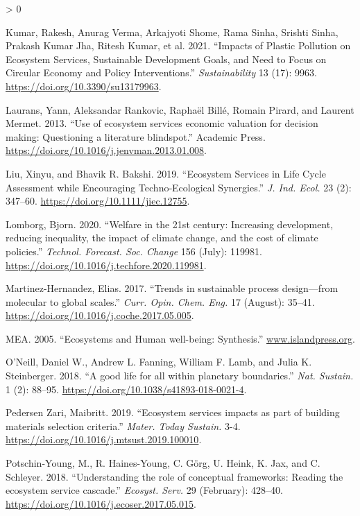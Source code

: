 \documentclass[
]{article}
\newlength{\cslhangindent}
\newenvironment{CSLReferences}[2] %
 {%
  \setlength{\parindent}{0pt}
  \ifodd #1 \everypar{\setlength{\hangindent}{\cslhangindent}}\ignorespaces\fi
  \ifnum #2 > 0
  \setlength{\parskip}{#2\baselineskip}
  \fi
 }%
 {}
\begin{document}
\begin{CSLReferences}{1}{0}
\leavevmode\hypertarget{ref-Kumar2021}{}%
Kumar, Rakesh, Anurag Verma, Arkajyoti Shome, Rama Sinha, Srishti Sinha, Prakash Kumar Jha, Ritesh Kumar, et al. 2021. {``{Impacts of Plastic Pollution on Ecosystem Services, Sustainable Development Goals, and Need to Focus on Circular Economy and Policy Interventions}.''} \emph{Sustainability} 13 (17): 9963. \url{https://doi.org/10.3390/su13179963}.

\leavevmode\hypertarget{ref-Laurans2013}{}%
Laurans, Yann, Aleksandar Rankovic, Raphaël Billé, Romain Pirard, and Laurent Mermet. 2013. {``{Use of ecosystem services economic valuation for decision making: Questioning a literature blindspot}.''} Academic Press. \url{https://doi.org/10.1016/j.jenvman.2013.01.008}.

\leavevmode\hypertarget{ref-Liu2019g}{}%
Liu, Xinyu, and Bhavik R. Bakshi. 2019. {``{Ecosystem Services in Life Cycle Assessment while Encouraging Techno‐Ecological Synergies}.''} \emph{J. Ind. Ecol.} 23 (2): 347--60. \url{https://doi.org/10.1111/jiec.12755}.

\leavevmode\hypertarget{ref-Lomborg2020}{}%
Lomborg, Bjorn. 2020. {``{Welfare in the 21st century: Increasing development, reducing inequality, the impact of climate change, and the cost of climate policies}.''} \emph{Technol. Forecast. Soc. Change} 156 (July): 119981. \url{https://doi.org/10.1016/j.techfore.2020.119981}.

\leavevmode\hypertarget{ref-Martinez-Hernandez2017}{}%
Martinez-Hernandez, Elias. 2017. {``{Trends in sustainable process design---from molecular to global scales}.''} \emph{Curr. Opin. Chem. Eng.} 17 (August): 35--41. \url{https://doi.org/10.1016/j.coche.2017.05.005}.

\leavevmode\hypertarget{ref-MEA2005}{}%
MEA. 2005. {``{Ecosystems and Human well-being: Synthesis}.''} \href{https://www.islandpress.org}{www.islandpress.org}.

\leavevmode\hypertarget{ref-ONeill2018}{}%
O'Neill, Daniel W., Andrew L. Fanning, William F. Lamb, and Julia K. Steinberger. 2018. {``{A good life for all within planetary boundaries}.''} \emph{Nat. Sustain.} 1 (2): 88--95. \url{https://doi.org/10.1038/s41893-018-0021-4}.

\leavevmode\hypertarget{ref-PedersenZari2019}{}%
Pedersen Zari, Maibritt. 2019. {``{Ecosystem services impacts as part of building materials selection criteria}.''} \emph{Mater. Today Sustain.} 3-4. \url{https://doi.org/10.1016/j.mtsust.2019.100010}.

\leavevmode\hypertarget{ref-Potschin-Young2018}{}%
Potschin-Young, M., R. Haines-Young, C. Görg, U. Heink, K. Jax, and C. Schleyer. 2018. {``{Understanding the role of conceptual frameworks: Reading the ecosystem service cascade}.''} \emph{Ecosyst. Serv.} 29 (February): 428--40. \url{https://doi.org/10.1016/j.ecoser.2017.05.015}.


\end{CSLReferences}
\end{document}
